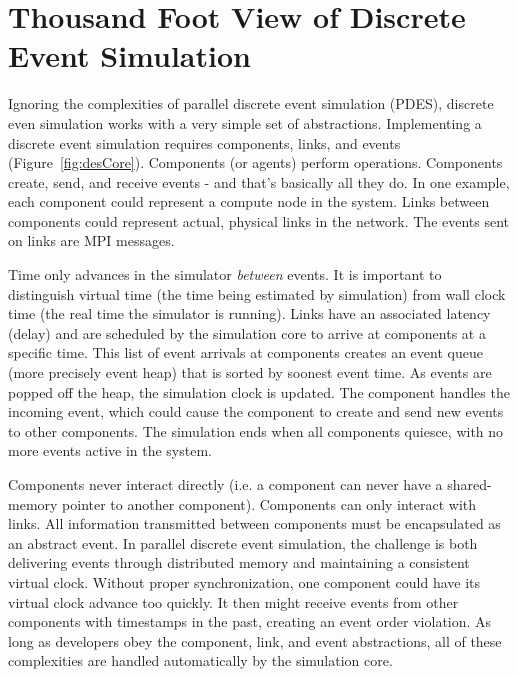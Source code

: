 \section{Thousand Foot View of Discrete Event Simulation}
Ignoring the complexities of parallel discrete event simulation (PDES), 
discrete even simulation works with a very simple set of abstractions.
Implementing a discrete event simulation requires components, links, and events (Figure~\ref{fig:desCore}).
Components (or agents) perform operations. Components create, send, and receive events - and that's basically all they do. 
In one example, each component could represent a compute node in the system.
Links between components could represent actual, physical links in the network.
The events sent on links are MPI messages.

Time only advances in the simulator \emph{between} events.
It is important to distinguish virtual time (the time being estimated by simulation) from wall clock time (the real time the simulator is running).
Links have an associated latency (delay) and are scheduled by the simulation core to arrive at components at a specific time.
This list of event arrivals at components creates an event queue (more precisely event heap) that is sorted by soonest event time.
As events are popped off the heap, the simulation clock is updated.
The component handles the incoming event, which could cause the component to create and send new events to other components.
The simulation ends when all components quiesce, with no more events active in the system.

Components never interact directly (i.e. a component can never have a shared-memory pointer to another component).
Components can only interact with links.
All information transmitted between components must be encapsulated as an abstract event.
In parallel discrete event simulation, the challenge is both delivering events through distributed memory and maintaining a consistent virtual clock.
Without proper synchronization, one component could have its virtual clock advance too quickly.
It then might receive events from other components with timestamps in the past,
creating an event order violation.
As long as developers obey the component, link, and event abstractions, all of these complexities are handled automatically by the simulation core.

